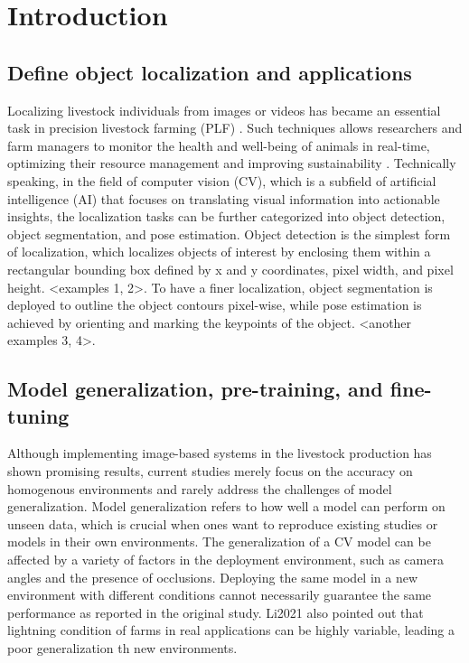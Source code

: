 \section{Introduction}

\subsection*{Define object localization and applications}

Localizing livestock individuals from images or videos has became an essential task in precision livestock farming (PLF) \citep{}. Such techniques allows researchers and farm managers to monitor the health and well-being of animals in real-time, optimizing their resource management and improving sustainability \citep{}. Technically speaking, in the field of computer vision (CV), which is a subfield of artificial intelligence (AI) that focuses on translating visual information into actionable insights, the localization tasks can be further categorized into object detection, object segmentation, and pose estimation. Object detection is the simplest form of localization, which localizes objects of interest by enclosing them within a rectangular bounding box defined by x and y coordinates, pixel width, and pixel height. <examples 1, 2>. To have a finer localization, object segmentation is deployed to outline the object contours pixel-wise, while pose estimation is achieved by orienting and marking the keypoints of the object. <another examples 3, 4>.

\subsection*{Model generalization, pre-training, and fine-tuning}

Although implementing image-based systems in the livestock production has shown promising results, current studies merely focus on the accuracy on homogenous environments and rarely address the challenges of model generalization. Model generalization refers to how well a model can perform on unseen data, which is crucial when ones want to reproduce existing studies or models in their own environments. The generalization of a CV model can be affected by a variety of factors in the deployment environment, such as camera angles and the presence of occlusions. Deploying the same model in a new environment with different conditions cannot necessarily guarantee the same performance as reported in the original study. \cite{} Li2021 also pointed out that lightning condition of farms in real applications can be highly variable, leading a poor generalization th new environments.

